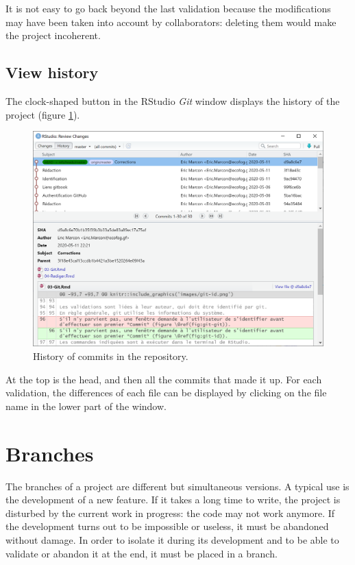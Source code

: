 \documentclass[
  12pt,
  american,
  a4paper,
  extrafontsizes,onecolumn,openright
  ]{memoir}
\begin{document}
It is not easy to go back beyond the last validation because the modifications may have been taken into account by collaborators: deleting them would make the project incoherent.

\hypertarget{view-history}{%
\subsection{View history}\label{view-history}}

The clock-shaped button in the RStudio \emph{Git} window displays the history of the project (figure \ref{fig:git-history}).



\scriptsize

\begin{figure}

{\centering \includegraphics[width=0.8\linewidth]{images/git-historique} 

}

\caption{History of commits in the repository.}\label{fig:git-history}
\end{figure}

\normalsize

At the top is the head, and then all the commits that made it up.
For each validation, the differences of each file can be displayed by clicking on the file name in the lower part of the window.

\hypertarget{sec:branches}{%
\section{Branches}\label{sec:branches}}

The branches of a project are different but simultaneous versions.
A typical use is the development of a new feature.
If it takes a long time to write, the project is disturbed by the current work in progress: the code may not work anymore.
If the development turns out to be impossible or useless, it must be abandoned without damage.
In order to isolate it during its development and to be able to validate or abandon it at the end, it must be placed in a branch.
\end{document}
